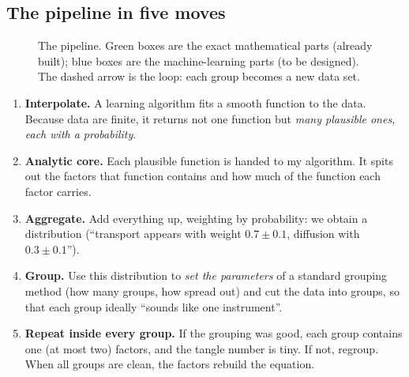 \documentclass[11pt,a4paper]{article}
\begin{document}
\subsection*{The pipeline in five moves}
\begin{figure}[!htb]
\centering
{}
\caption{The pipeline. Green boxes are the exact mathematical parts (already built); blue boxes are the machine-learning parts (to be designed). The dashed arrow is the loop: each group becomes a new data set.}
\label{fig:pipe}
\end{figure}

\begin{enumerate}[leftmargin=*]
\item \textbf{Interpolate.} A learning algorithm fits a smooth function to the data. Because data are finite, it returns not one function but \emph{many plausible ones, each with a probability}.
\item \textbf{Analytic core.} Each plausible function is handed to my algorithm. It spits out the factors that function contains and how much of the function each factor carries.
\item \textbf{Aggregate.} Add everything up, weighting by probability: we obtain a distribution (``transport appears with weight $0.7\pm0.1$, diffusion with $0.3\pm0.1$'').
\item \textbf{Group.} Use this distribution to \emph{set the parameters} of a standard grouping method (how many groups, how spread out) and cut the data into groups, so that each group ideally ``sounds like one instrument''.
\item \textbf{Repeat inside every group.} If the grouping was good, each group contains one (at most two) factors, and the tangle number is tiny. If not, regroup. When all groups are clean, the factors rebuild the equation.
\end{enumerate}
\end{document}

